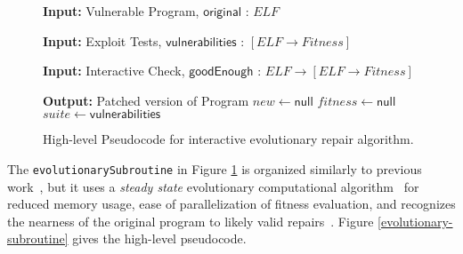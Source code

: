 \documentclass{sig-alternate}
\begin{document}
\begin{figure}[htb]
\begin{algorithmic}[1]
\small
\item[{\textbf{Input: }} {Vulnerable Program, $\mathsf{original}$ : $ELF$}]
\item[{\textbf{Input: }} {Exploit Tests, $\mathsf{vulnerabilities}$ : $[ELF \rightarrow Fitness]$}]
\item[{\textbf{Input: }} {Interactive Check, $\mathsf{goodEnough}$ : $ELF \rightarrow [ELF \rightarrow Fitness]$}]
\item[{\textbf{Output: }} {Patched version of Program}]
   $new \leftarrow \mathsf{null}$
   $fitness \leftarrow \mathsf{null}$
   $suite \leftarrow \mathsf{vulnerabilities}$
\end{algorithmic}
\caption{\label{lazy-algorithm}High-level Pseudocode for interactive
  evolutionary repair algorithm.}
\end{figure}

The \texttt{evolutionarySubroutine} in Figure \ref{lazy-algorithm} is
organized similarly to previous work~\cite{genprog-tse-journal}, but
it uses a \emph{steady state} evolutionary computational
algorithm~\cite{Luke2013Metaheuristics} for reduced memory usage, ease
of parallelization of fitness evaluation, and recognizes the nearness
of the original program to likely valid
repairs~\cite[\S2.2.2]{schulte2014dissertation}.  Figure
\ref{evolutionary-subroutine} gives the high-level pseudocode.
\end{document}

